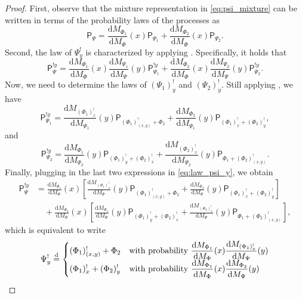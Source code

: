 \documentclass[11pt,a4paper,oneside]{article}
\newcommand{\deq}{\stackrel{\mbox{\scriptsize d}}{=}}
\newcommand{\dd}{\mathrm d}
\newcommand{\plaw}{\mathsf{P}}
\theoremstyle{definition}
\theoremstyle{remark}
\begin{document}
\begin{proof}
First, observe that the mixture representation in \eqref{eq:psi_mixture} can be written in terms of the probability laws  of the processes as
\[
\plaw_{\Psi} = \frac{\dd M_{\Phi_1}}{\dd M_{\Phi}} (x) \plaw_{\Psi_1} + \frac{\dd M_{\Phi_2}}{\dd M_{\Phi}} (x) \plaw_{\Psi_2}.
\]
Second, the law of $\Psi^!_y$ is characterized by applying . Specifically, it holds that
\begin{equation}\label{eq:law_psi_y}
    \plaw^{!y}_{\Psi} = \frac{\dd M_{\Phi_1}}{\dd M_{\Phi}} (x) \frac{\dd M_{\Psi_1}}{\dd M_{\Psi}} (y) \plaw^{!y}_{\Psi_1} + \frac{\dd M_{\Phi_2}}{\dd M_{\Phi}} (x) \frac{\dd M_{\Psi_2}}{\dd M_{\Psi}} (y) \plaw^{!y}_{\Psi_2}.
\end{equation}
Now, we need to determine the laws of $(\Psi_1)^!_y$ and $(\Psi_2)^!_y$. Still applying , we have
\[
\plaw^{!y}_{\Psi_1} = \frac{\dd M_{(\Phi_1)^!_x}}{\dd M_{\Psi_1}} (y) \plaw_{(\Phi_1)^!_{(x,y)} + \Phi_2} + \frac{\dd M_{\Phi_2}}{\dd M_{\Psi_1}} (y) \plaw_{(\Phi_1)^!_{x} + (\Phi_2)^!_{y}},
\]
and 
\[
\plaw^{!y}_{\Psi_2} = \frac{\dd M_{\Phi_1}}{\dd M_{\Psi_2}} (y) \plaw_{(\Phi_1)^!_{y} + (\Phi_2)^!_x} + \frac{\dd M_{(\Phi_2)^!_x}}{\dd M_{\Psi_2}} (y) \plaw_{\Phi_1 + (\Phi_2)^!_{(x,y)}}.
\]
Finally, plugging in the last two expressions in \eqref{eq:law_psi_y}, we obtain
\begin{equation*}
    \begin{aligned}
        \plaw^{!y}_{\Psi} &= \frac{\dd M_{\Phi_1}}{\dd M_{\Phi}} (x) \left[ \frac{\dd M_{(\Phi_1)^!_x}}{\dd M_{\Psi}} (y) \plaw_{(\Phi_1)^!_{(x,y)} + \Phi_2} + \frac{\dd M_{\Phi_2}}{\dd M_{\Psi}} (y) \plaw_{(\Phi_1)^!_{x} + (\Phi_2)^!_{y}} \right]\\
        &\quad + \frac{\dd M_{\Phi_2}}{\dd M_{\Phi}} (x) \left[  \frac{\dd M_{\Phi_1}}{\dd M_{\Psi}} (y) \plaw_{(\Phi_1)^!_{y} + (\Phi_2)^!_x} + \frac{\dd M_{(\Phi_2)^!_x}}{\dd M_{\Psi}} (y) \plaw_{\Phi_1 + (\Phi_2)^!_{(x,y)}}\right],
    \end{aligned}
\end{equation*}
which is equivalent to write
\[
    \Psi^!_y \deq \begin{cases}
        (\Phi_1)^!_{(x, y)} + \Phi_2 &\text{with probability }\displaystyle{\frac{\dd M_{\Phi_1}}{\dd M_{\Phi}} (x) \frac{\dd M_{(\Phi_1)^!_x}}{\dd M_{\Psi}} (y)} \\
        (\Phi_1)^!_{x} +  (\Phi_2)^!_{y} &\text{with probability }  \displaystyle{\frac{\dd M_{\Phi_1}}{\dd M_{\Phi}} (x)  \frac{\dd M_{\Phi_2}}{\dd M_{\Psi}} (y)}\\

\end{cases}\]
\end{proof}
\end{document}
